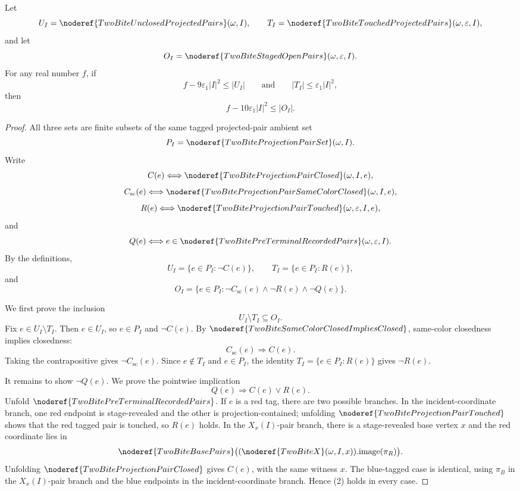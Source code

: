 \begin{helper}
Let
\[
U_I=\noderef{TwoBiteUnclosedProjectedPairs}(\omega,I),\qquad
T_I=\noderef{TwoBiteTouchedProjectedPairs}(\omega,\varepsilon,I),
\]
and let
\[
O_I=\noderef{TwoBiteStagedOpenPairs}(\omega,\varepsilon,I).
\]
For any real number \(f\), if
\[
f-9\varepsilon_1|I|^2\le |U_I|
\qquad\text{and}\qquad
|T_I|\le \varepsilon_1|I|^2,
\]
then
\[
f-10\varepsilon_1|I|^2\le |O_I|.
\]
\end{helper}
\begin{proof}
All three sets are finite subsets of the same tagged projected-pair ambient
set
\[
P_I=\noderef{TwoBiteProjectionPairSet}(\omega,I).
\]
Write
\[
C(e)\Longleftrightarrow
\noderef{TwoBiteProjectionPairClosed}(\omega,I,e),
\]
\[
C_{\mathrm{sc}}(e)\Longleftrightarrow
\noderef{TwoBiteProjectionPairSameColorClosed}(\omega,I,e),
\]
\[
R(e)\Longleftrightarrow
\noderef{TwoBiteProjectionPairTouched}(\omega,\varepsilon,I,e),
\]
and
\[
Q(e)\Longleftrightarrow
e\in\noderef{TwoBitePreTerminalRecordedPairs}(\omega,\varepsilon,I).
\]
By the definitions,
\[
U_I=\{e\in P_I:\neg C(e)\},
\qquad
T_I=\{e\in P_I:R(e)\},
\]
and
\[
O_I=\{e\in P_I:\neg C_{\mathrm{sc}}(e)\wedge\neg R(e)\wedge\neg Q(e)\}.
\]

We first prove the inclusion
\[
U_I\setminus T_I\subseteq O_I. \tag{1}
\]
Fix \(e\in U_I\setminus T_I\).  Then \(e\in U_I\), so \(e\in P_I\) and
\(\neg C(e)\).  By
\(\noderef{TwoBiteSameColorClosedImpliesClosed}\), same-color closedness
implies closedness:
\[
C_{\mathrm{sc}}(e)\Longrightarrow C(e).
\]
Taking the contrapositive gives \(\neg C_{\mathrm{sc}}(e)\).  Since
\(e\notin T_I\) and \(e\in P_I\), the identity
\(T_I=\{e\in P_I:R(e)\}\) gives \(\neg R(e)\).

It remains to show \(\neg Q(e)\).  We prove the pointwise implication
\[
Q(e)\Longrightarrow C(e)\vee R(e). \tag{2}
\]
Unfold \(\noderef{TwoBitePreTerminalRecordedPairs}\).  If \(e\) is a red
tag, there are two possible branches.  In the incident-coordinate branch,
one red endpoint is stage-revealed and the other is projection-contained;
unfolding \(\noderef{TwoBiteProjectionPairTouched}\) shows that the red
tagged pair is touched, so \(R(e)\) holds.  In the \(X_x(I)\)-pair branch,
there is a stage-revealed base vertex \(x\) and the red coordinate lies in
\[
\noderef{TwoBiteBasePairs}
\bigl((\noderef{TwoBiteX}(\omega,I,x)).\mathrm{image}(\pi_R)\bigr).
\]
Unfolding \(\noderef{TwoBiteProjectionPairClosed}\) gives \(C(e)\), with
the same witness \(x\).  The blue-tagged case is identical, using
\(\pi_B\) in the \(X_x(I)\)-pair branch and the blue endpoints in the
incident-coordinate branch.  Hence (2) holds in every case.


\end{proof}
